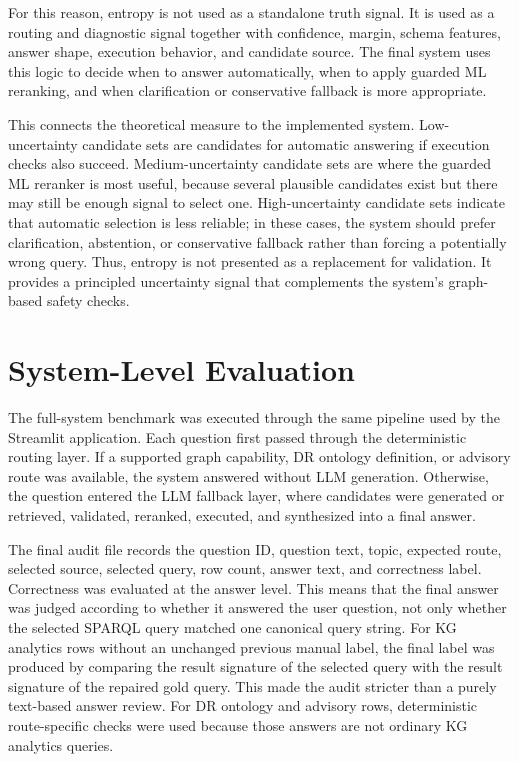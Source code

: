 \documentclass[
  12pt,
  english,
  oneside]{report}
\begin{document}
For this reason, entropy is not used as a standalone truth signal. It is used as a routing and diagnostic signal together with confidence, margin, schema features, answer shape, execution behavior, and candidate source. The final system uses this logic to decide when to answer automatically, when to apply guarded ML reranking, and when clarification or conservative fallback is more appropriate.

This connects the theoretical measure to the implemented system. Low-uncertainty candidate sets are candidates for automatic answering if execution checks also succeed. Medium-uncertainty candidate sets are where the guarded ML reranker is most useful, because several plausible candidates exist but there may still be enough signal to select one. High-uncertainty candidate sets indicate that automatic selection is less reliable; in these cases, the system should prefer clarification, abstention, or conservative fallback rather than forcing a potentially wrong query. Thus, entropy is not presented as a replacement for validation. It provides a principled uncertainty signal that complements the system's graph-based safety checks.

\section{System-Level Evaluation}
\label{sec:system-level-evaluation-method}

The full-system benchmark was executed through the same pipeline used by the Streamlit application. Each question first passed through the deterministic routing layer. If a supported graph capability, DR ontology definition, or advisory route was available, the system answered without LLM generation. Otherwise, the question entered the LLM fallback layer, where candidates were generated or retrieved, validated, reranked, executed, and synthesized into a final answer.

The final audit file records the question ID, question text, topic, expected route, selected source, selected query, row count, answer text, and correctness label. Correctness was evaluated at the answer level. This means that the final answer was judged according to whether it answered the user question, not only whether the selected SPARQL query matched one canonical query string. For KG analytics rows without an unchanged previous manual label, the final label was produced by comparing the result signature of the selected query with the result signature of the repaired gold query. This made the audit stricter than a purely text-based answer review. For DR ontology and advisory rows, deterministic route-specific checks were used because those answers are not ordinary KG analytics queries.
\end{document}
